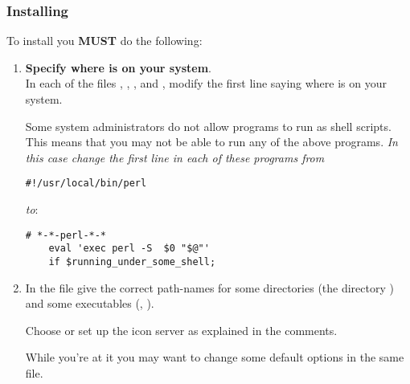 \subsubsection{Installing \protect\latextohtml}%
\html{\\}%
To install \latextohtml{} you \textbf{MUST} do the following:
%
\begin{enumerate}
\item 
\textbf{Specify where \Perl{} is on your system}. \\
In each of the files , , ,
 and ,
modify the first line saying where \Perl{} is on your system.


\noindent
Some system administrators do not allow \Perl{} programs to run as shell scripts. 
This means that you may not be able to run any of the above programs. 
\emph{In this case change the first line in each of these programs from }
\html{\smallskip}
\begin{small}
\verb|#!/usr/local/bin/perl | 
\end{small}
\html{\smallskip}\emph{to}:
\begin{small}
\begin{verbatim}
# *-*-perl-*-*
    eval 'exec perl -S  $0 "$@"'
    if $running_under_some_shell; 
\end{verbatim}
\end{small}

%
\item 
In the file  give the correct path-names for 
some directories (the  directory ) 
and some executables (, ). 

Choose or set up the icon server as explained in the comments.


While you're at it you may want to change some default 
options in the same file.


\end{enumerate}
